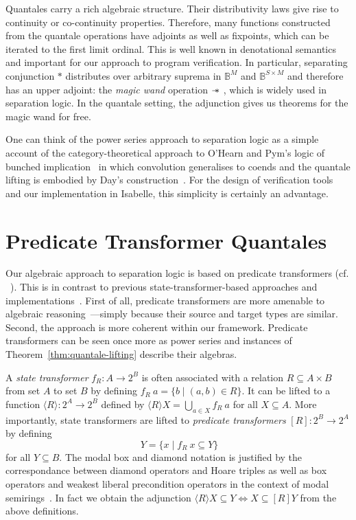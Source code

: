 \documentclass[twoside,runningheads,envcountsame,envcountsect,oribibl,orivec]{llncs}
\newcommand{\predT}[1]{[#1]}
\newcommand{\wand}{-\hspace{-0.42em}\ast\ }
\begin{document}
Quantales carry a rich algebraic structure. Their distributivity laws
give rise to continuity or co-continuity properties.  Therefore, many
functions constructed from the quantale operations have adjoints as
well as fixpoints, which can be iterated to the first limit
ordinal. This is well known in denotational semantics and important
for our approach to program verification.  In particular, separating
conjunction $\ast$ distributes over arbitrary suprema in
$\mathbb{B}^M$ and $\mathbb{B}^{S\times M}$ and therefore has an upper
adjoint: the \emph{magic wand} operation $\wand$, which is widely used
in separation logic. In the quantale setting, the adjunction gives us
theorems for the magic wand for free.

One can think of the power series approach to separation logic as a
simple account of the category-theoretical approach to O'Hearn and
Pym's logic of bunched implication~\cite{OHearnP99} in which
convolution generalises to coends and the quantale lifting is embodied
by Day's construction~\cite{Day}. For the design of verification tools
and our implementation in Isabelle, this simplicity is certainly an
advantage.



\section{Predicate Transformer Quantales} \label{S:pt_quantale}

Our algebraic approach to separation logic is based on predicate
transformers (cf. ~\cite{BvW99-book}).  This is in contrast to
previous state-transformer-based approaches and
implementations~\cite{COY07,NICTA,Tuerk}.  First of all, predicate
transformers are more amenable to algebraic
reasoning~\cite{BvW99-book}---simply because their source and target
types are similar. Second, the approach is more coherent within our
framework.  Predicate transformers can be seen once more as power
series and instances of Theorem~\ref{thm:quantale-lifting} describe
their algebras.

A \emph{state transformer} $f_R:A\to 2^B$ is often associated with a
relation $R\subseteq A\times B$ from set $A$ to set $B$ by defining $
f_R\ a=\{b \mid (a,b)\in R\}$. It can be lifted to a function $\langle
R\rangle:2^A\to 2^B$ defined by $\langle R\rangle X = \bigcup_{a\in X}
f_R\ a$ for all $X\subseteq A$. More importantly, state transformers
are lifted to \emph{predicate transformers} $\predT{R}:2^B\to 2^A$ by
defining
\begin{equation*}
  \predT{R}\ Y=\{x \mid f_R\ x\subseteq Y\}
\end{equation*}
for all $Y\subseteq B$. The modal box and diamond notation is
justified by the correspondance between diamond operators and Hoare
triples as well as box operators and weakest liberal precondition
operators in the context of modal semirings~\cite{MoellerStruth}. In
fact we obtain the adjunction $\langle R\rangle X \subseteq
Y\Leftrightarrow X\subseteq [R]Y$ from the above definitions.
\end{document}

